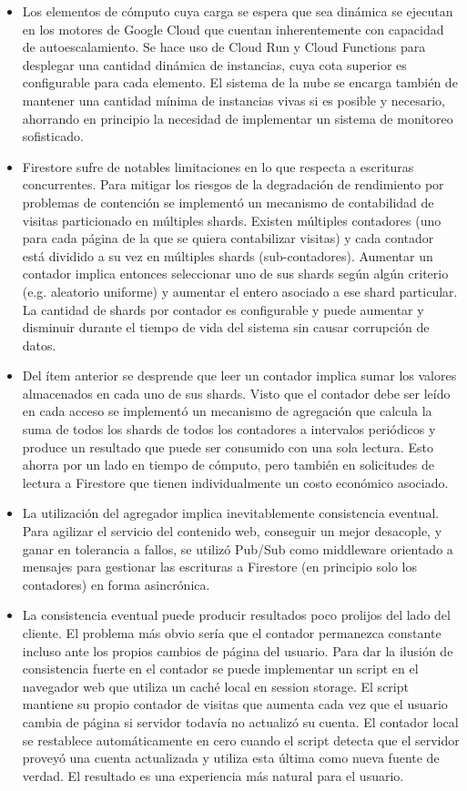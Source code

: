 \documentclass[11pt]{scrartcl}
\begin{document}
\begin{itemize}
\item Los elementos de cómputo cuya carga se espera que sea dinámica se ejecutan en los motores de Google Cloud que cuentan inherentemente con capacidad de autoescalamiento. Se hace uso de Cloud Run y Cloud Functions para desplegar una cantidad dinámica de instancias, cuya cota superior es configurable para cada elemento. El sistema de la nube se encarga también de mantener una cantidad mínima de instancias vivas si es posible y necesario, ahorrando en principio la necesidad de implementar un sistema de monitoreo sofisticado.
\item Firestore sufre de notables limitaciones en lo que respecta a escrituras concurrentes. Para mitigar los riesgos de la degradación de rendimiento por problemas de contención se implementó un mecanismo de contabilidad de visitas particionado en múltiples shards. Existen múltiples contadores (uno para cada página de la que se quiera contabilizar visitas) y cada contador está dividido a su vez en múltiples shards (sub-contadores). Aumentar un contador implica entonces seleccionar uno de sus shards según algún criterio (e.g. aleatorio uniforme) y aumentar el entero asociado a ese shard particular. La cantidad de shards por contador es configurable y puede aumentar y disminuir durante el tiempo de vida del sistema sin causar corrupción de datos.
\item Del ítem anterior se desprende que leer un contador implica sumar los valores almacenados en cada uno de sus shards. Visto que el contador debe ser leído en cada acceso se implementó un mecanismo de agregación que calcula la suma de todos los shards de todos los contadores a intervalos periódicos y produce un resultado que puede ser consumido con una sola lectura. Esto ahorra por un lado en tiempo de cómputo, pero también en solicitudes de lectura a Firestore que tienen individualmente un costo económico asociado.
\item La utilización del agregador implica inevitablemente consistencia eventual.  Para agilizar el servicio del contenido web, conseguir un mejor desacople, y ganar en tolerancia a fallos, se utilizó Pub/Sub como middleware orientado a mensajes para gestionar las escrituras a Firestore (en principio solo los contadores) en forma asincrónica.
\item La consistencia eventual puede producir resultados poco prolijos del lado del cliente. El problema más obvio sería que el contador permanezca constante incluso ante los propios cambios de página del usuario. Para dar la ilusión de consistencia fuerte en el contador se puede implementar un script en el navegador web que utiliza un caché local en session storage. El script mantiene su propio contador de visitas que aumenta cada vez que el usuario cambia de página si servidor todavía no actualizó su cuenta. El contador local se restablece automáticamente en cero cuando el script detecta que el servidor proveyó una cuenta actualizada y utiliza esta última como nueva fuente de verdad. El resultado es una experiencia más natural para el usuario.
\end{itemize}
\end{document}

